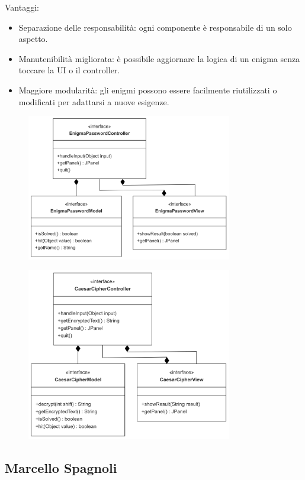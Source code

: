 \documentclass[a4paper,12pt]{report}
\begin{document}
Vantaggi:
\begin{itemize}
	\item Separazione delle responsabilità: ogni componente è responsabile di un solo aspetto. 
	\item Manutenibilità migliorata: è possibile aggiornare la logica di un enigma senza toccare la UI o il controller.
	\item Maggiore modularità: gli enigmi possono essere facilmente riutilizzati o modificati per adattarsi a nuove esigenze.
\end{itemize}
\begin{figure}[h]
    \centering
    \includegraphics[width=0.8\textwidth]{img/enigmaPassword.png}
    \label{img:enigmaPassword}
\end{figure}
\begin{figure}[h]
    \centering
    \includegraphics[width=0.8\textwidth]{img/caesarCipher.png}
    \label{img:caesarCipher}
\end{figure}
%
\subsection{Marcello Spagnoli}
%
\end{document}
